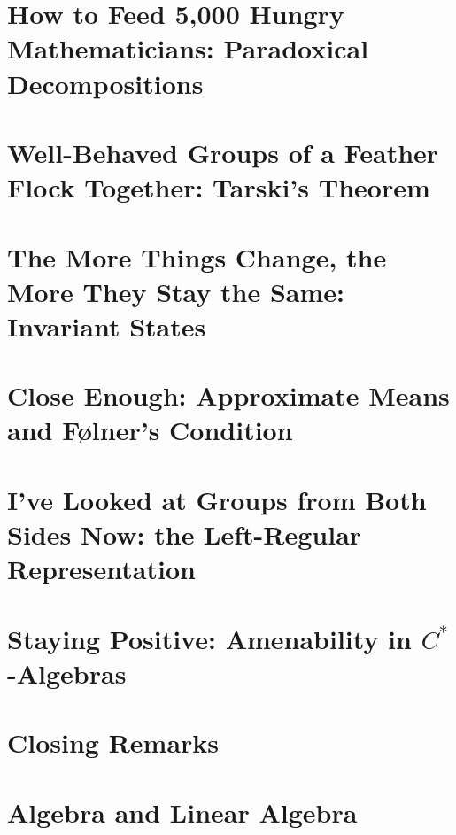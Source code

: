 \documentclass[11pt]{package2}
\begin{document}
\chapter{How to Feed 5,000 Hungry Mathematicians: Paradoxical Decompositions}\label{ch:paradoxical_decompositions}

\chapter{Well-Behaved Groups of a Feather Flock Together: Tarski's Theorem}\label{ch:tarskis_theorem}

\chapter{The More Things Change, the More They Stay the Same: Invariant States}\label{ch:invariant_states}

\chapter{Close Enough: Approximate Means and Følner's Condition}\label{ch:folner_condition}

\chapter{I've Looked at Groups from Both Sides Now: the Left-Regular Representation}\label{ch:left_regular_representation}

\chapter{Staying Positive: Amenability in \texorpdfstring{$C^{\ast}$-Algebras}{C*-Algebras}}\label{ch:nuclearity}

\chapter{Closing Remarks}

\appendix
\chapter{Algebra and Linear Algebra}\label{ch:algebra_and_linear_algebra}

\end{document}
